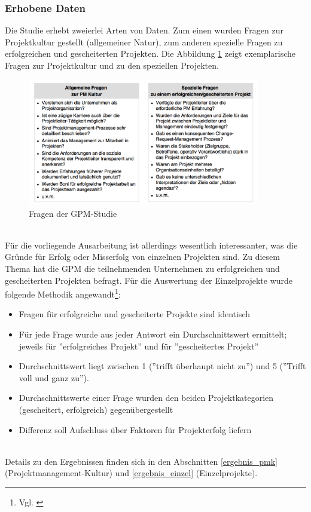 \documentclass[12pt]{scrartcl}
\begin{document}
\subsubsection{Erhobene Daten}
\label{erhobene_daten}
Die Studie erhebt zweierlei Arten von Daten. Zum einen wurden Fragen zur Projektkultur gestellt (allgemeiner Natur), zum anderen spezielle Fragen zu erfolgreichen und gescheiterten Projekten. Die Abbildung \ref{fragen_gpm_studie} zeigt exemplarische Fragen zur Projektkultur und zu den speziellen Projekten. 

\begin{figure}[H]
	\begin{center}
		\includegraphics[width=0.9\textwidth]{img/fragen_gpm_studie}
		\caption{Fragen der GPM-Studie}
		\label{fragen_gpm_studie}	
	\end{center}
\end{figure}
\ 
\\
Für die vorliegende Ausarbeitung ist allerdings wesentlich interessanter, was die Gründe für Erfolg oder Misserfolg von einzelnen Projekten sind. Zu diesem Thema hat die GPM die teilnehmenden Unternehmen zu erfolgreichen und gescheiterten Projekten befragt. Für die Auswertung der Einzelprojekte wurde folgende Methodik angewandt\footnote{Vgl. \cite{GPM_Studie_2008, Seite 9}}: %
\begin{itemize}
    \item{Fragen für erfolgreiche und gescheiterte Projekte sind identisch}
    \item{Für jede Frage wurde aus jeder Antwort ein Durchschnittswert ermittelt; jeweils für ''erfolgreiches Projekt'' und für ''gescheitertes Projekt''}
    \item{Durchschnittswert liegt zwischen 1 (''trifft überhaupt nicht zu'') und 5 (''Trifft voll und ganz zu'').}
    \item{Durchschnittswerte einer Frage wurden den beiden Projektkategorien (gescheitert, erfolgreich) gegenübergestellt}
    \item{Differenz soll Aufschluss über Faktoren für Projekterfolg liefern}
\end{itemize}
\
\\
Details zu den Ergebnissen finden sich in den Abschnitten \ref{ergebnis_pmk} (Projektmanagement-Kultur) und \ref{ergebnis_einzel} (Einzelprojekte).
\end{document}
